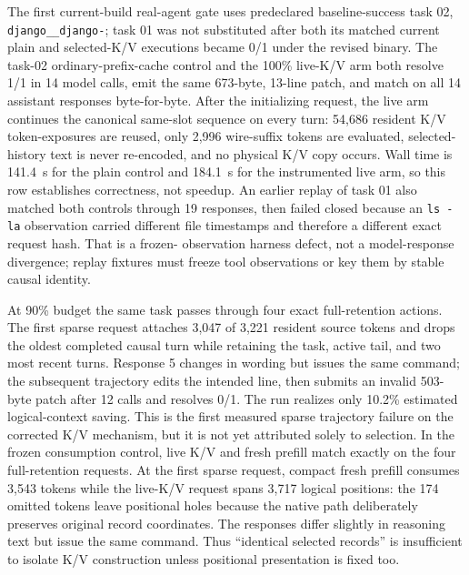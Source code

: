 \documentclass[11pt]{article}
\begin{document}
The first current-build real-agent gate uses predeclared baseline-success task
02, \texttt{django\_\_django-}; task 01 was not substituted after both its
matched current plain and selected-K/V executions became 0/1 under the revised
binary.  The task-02 ordinary-prefix-cache control and the 100\% live-K/V arm
both resolve 1/1 in 14 model calls, emit the same 673-byte, 13-line patch, and
match on all 14 assistant responses byte-for-byte.  After the initializing
request, the live arm continues the canonical same-slot sequence on every turn:
54,686 resident K/V token-exposures are reused, only 2,996 wire-suffix tokens
are evaluated, selected-history text is never re-encoded, and no physical K/V
copy occurs.  Wall time is 141.4~s for the plain control and 184.1~s for the
instrumented live arm, so this row establishes correctness, not speedup.  An
earlier replay of task 01 also matched both controls through 19 responses, then
failed closed because an \texttt{ls -la} observation carried different file
timestamps and therefore a different exact request hash.  That is a frozen-
observation harness defect, not a model-response divergence; replay fixtures
must freeze tool observations or key them by stable causal identity.

At 90\% budget the same task passes through four exact full-retention actions.
The first sparse request attaches 3,047 of 3,221 resident source tokens and
drops the oldest completed causal turn while retaining the task, active tail,
and two most recent turns.  Response 5 changes in wording but issues the same
command; the subsequent trajectory edits the intended line, then submits an
invalid 503-byte patch after 12 calls and resolves 0/1.  The run realizes only
10.2\% estimated logical-context saving.  This is the first measured sparse
trajectory failure on the corrected K/V mechanism, but it is not yet
attributed solely to selection.  In the frozen consumption control, live K/V
and fresh prefill match exactly on the four full-retention requests.  At the
first sparse request, compact fresh prefill consumes 3,543 tokens while the
live-K/V request spans 3,717 logical positions: the 174 omitted tokens leave
positional holes because the native path deliberately preserves original
record coordinates.  The responses differ slightly in reasoning text but
issue the same command.  Thus ``identical selected records'' is insufficient
to isolate K/V construction unless positional presentation is fixed too.
\end{document}
